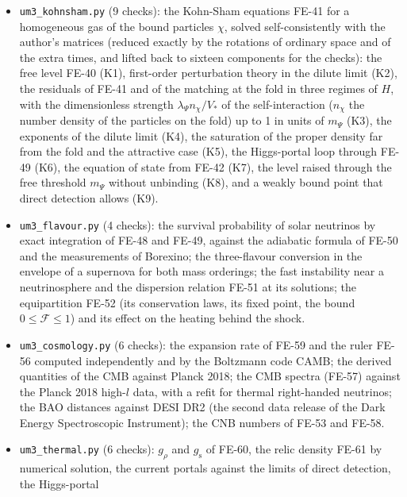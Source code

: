 \documentclass[
  10pt,
]{article}
\begin{document}
\begin{itemize}
  extra times excluded by observation, for each assumed pressure of the
  baryons along the extra times (SR5), the volume held by the fold fluid
  and \(q_{\mathrm{hold}}\) today for the three pressures of the baryons
  (SR6).
\item
  \texttt{um3\_kohnsham.py} (9 checks): the Kohn-Sham equations FE-41
  for a homogeneous gas of the bound particles \(\chi\), solved
  self-consistently with the author's matrices (reduced exactly by the
  rotations of ordinary space and of the extra times, and lifted back to
  sixteen components for the checks): the free level FE-40 (K1),
  first-order perturbation theory in the dilute limit (K2), the
  residuals of FE-41 and of the matching at the fold in three regimes of
  \(H\), with the dimensionless strength \(\lambda_\Psi n_\chi/V_*\) of
  the self-interaction (\(n_\chi\) the number density of the particles
  on the fold) up to 1 in units of \(m_\Psi\) (K3), the exponents of the
  dilute limit (K4), the saturation of the proper density far from the
  fold and the attractive case (K5), the Higgs-portal loop through FE-49
  (K6), the equation of state from FE-42 (K7), the level raised through
  the free threshold \(m_\Psi\) without unbinding (K8), and a weakly
  bound point that direct detection allows (K9).
\item
  \texttt{um3\_flavour.py} (4 checks): the survival probability of solar
  neutrinos by exact integration of FE-48 and FE-49, against the
  adiabatic formula of FE-50 and the measurements of Borexino; the
  three-flavour conversion in the envelope of a supernova for both mass
  orderings; the fast instability near a neutrinosphere and the
  dispersion relation FE-51 at its solutions; the equipartition FE-52
  (its conservation laws, its fixed point, the bound
  \(0 \le \mathcal{F} \le 1\)) and its effect on the heating behind the
  shock.
\item
  \texttt{um3\_cosmology.py} (6 checks): the expansion rate of FE-59 and
  the ruler FE-56 computed independently and by the Boltzmann code CAMB;
  the derived quantities of the CMB against Planck 2018; the CMB spectra
  (FE-57) against the Planck 2018 high-\(l\) data, with a refit for
  thermal right-handed neutrinos; the BAO distances against DESI DR2
  (the second data release of the Dark Energy Spectroscopic Instrument);
  the CNB numbers of FE-53 and FE-58.
\item
  \texttt{um3\_thermal.py} (6 checks): \(g_\rho\) and \(g_{\mathrm{s}}\)
  of FE-60, the relic density FE-61 by numerical solution, the current
  portals against the limits of direct detection, the Higgs-portal

\end{itemize}
\end{document}

